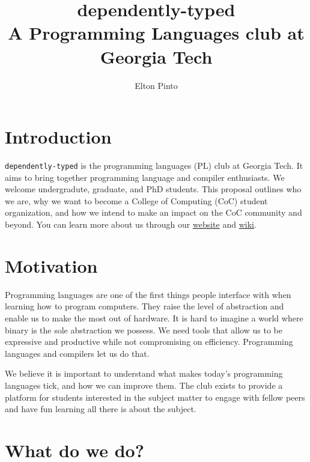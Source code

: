 \documentclass[12pt]{article}
\title{
  dependently-typed\\
  \large A Programming Languages club at Georgia Tech
}
\author{Elton Pinto}
\date{}
\begin{document}
\maketitle

\section{Introduction} \label{sec:intro}

\verb|dependently-typed| is the programming languages (PL) club at Georgia Tech. It aims to bring together programming language and compiler enthusiasts. We welcome undergradute, graduate, and PhD students. This proposal outlines who we are, why we want to become a College of Computing (CoC) student organization, and how we intend to make an impact on the CoC community and beyond. You can learn more about us through our \href{https://dtyped.netlify.app/}{website} and \href{https://dtyped-wiki.netlify.app/}{wiki}.

\section{Motivation} \label{sec:motivation}

Programming languages are one of the first things people interface with when learning how to program computers. They raise the level of abstraction and enable us to make the most out of hardware. It is hard to imagine a world where binary is the sole abstraction we possess. We need tools that allow us to be expressive and productive while not compromising on efficiency. Programming languages and compilers let us do that.


We believe it is important to understand what makes today's programming languages tick, and how we can improve them. The club exists to provide a platform for students interested in the subject matter to engage with fellow peers and have fun learning all there is about the subject.

\section{What do we do?} \label{sec:what_we_do}
\end{document}
